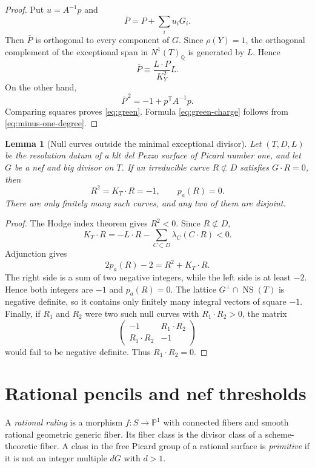 \documentclass[11pt,reqno]{amsart}
\newtheorem{lemma}[lemma]{Lemma}
\theoremstyle{definition}
\theoremstyle{remark}
\DeclareMathOperator{\NS}{NS}
\newcommand{\PP}{\mathbb P}
\newcommand{\QQ}{\mathbb Q}
\numberwithin{equation}{section}
\begin{document}
\begin{proof}
Put $u=A^{-1}p$ and
\[
  \overline P=P+\sum_i u_iG_i.
\]
Then $\overline P$ is orthogonal to every component of $G$.  Since $\rho(Y)=1$, the orthogonal complement of the exceptional span in $N^1(T)_\QQ$ is generated by $L$.  Hence
\[
  \overline P\equiv\frac{L\cdot P}{K_Y^2}L.
\]
On the other hand,
\[
  \overline P^{\,2}=-1+p^{\mathsf T}A^{-1}p.
\]
Comparing squares proves \eqref{eq:green}.  Formula \eqref{eq:green-charge} follows from \eqref{eq:minus-one-degree}.
\end{proof}

\begin{lemma}[Null curves outside the minimal exceptional divisor]\label{lem:exterior-null-curves}
Let $(T,D,L)$ be the resolution datum of a klt del Pezzo surface of
Picard number one, and let $G$ be a nef and big divisor on $T$.  If an irreducible curve $R\not\subset D$ satisfies $G\cdot R=0$, then
\[
  R^2=K_T\cdot R=-1,
  \qquad p_a(R)=0.
\]
There are only finitely many such curves, and any two of them are disjoint.
\end{lemma}

\begin{proof}
The Hodge index theorem gives $R^2<0$.  Since $R\not\subset D$,
\[
  K_T\cdot R
  =-L\cdot R-\sum_{C\subset D}\lambda_C(C\cdot R)<0.
\]
Adjunction gives
\[
  2p_a(R)-2=R^2+K_T\cdot R.
\]
The right side is a sum of two negative integers, while the left side is at least $-2$.  Hence both integers are $-1$ and $p_a(R)=0$.  The lattice $G^\perp\cap\NS(T)$ is negative definite, so it contains only finitely many integral vectors of square $-1$.  Finally, if $R_1$ and $R_2$ were two such null curves with $R_1\cdot R_2>0$, the matrix
\[
  \begin{pmatrix}-1&R_1\cdot R_2\\ R_1\cdot R_2&-1\end{pmatrix}
\]
would fail to be negative definite.  Thus $R_1\cdot R_2=0$.
\end{proof}


\section{Rational pencils and nef thresholds}
\label{sec:pencils}
A \emph{rational ruling} is a morphism $f:S\to\PP^1$ with connected
fibers and smooth rational geometric generic fiber. Its fiber class is
the divisor class of a scheme-theoretic fiber. A class in the free
Picard group of a rational surface is \emph{primitive} if it is not an
integer multiple $dG$ with $d>1$.
\end{document}
